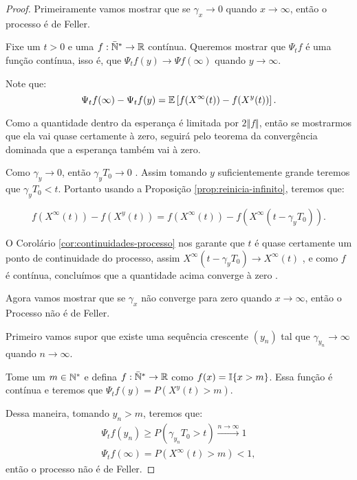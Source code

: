 \begin{proof}

  Primeiramente vamos mostrar que se $\gamma_x \to 0$ quando $x \to
  \infty$, então o processo é de Feller.

  Fixe um $t > 0$ e uma $f: {\mathbb{\bar{N}^*}} \to {\mathbb{R}}$ contínua. Queremos mostrar
  que $\Psi_t f$ é uma função contínua, isso é, que $\Psi_t f(y) \to
  \Psi f (\infty)$ quando $y \to \infty$.

  Note que:
  \begin{displaymath}
    \Psi_t f(\infty) - \Psi_t f (y) =
    {\mathbb{E}} \left[
      f(X^\infty(t)) - f(X^y(t))
    \right].
  \end{displaymath}

  Como a quantidade dentro da esperança é limitada por $2 \Vert f
  \Vert$, então se mostrarmos que ela vai quase certamente à zero,
  seguirá pelo teorema da convergência dominada que a esperança também
  vai à zero.

  Como $\gamma_y \to 0$, então $\gamma_y T_0 \to 0$ \qc. Assim tomando
  $y$ suficientemente grande teremos que $\gamma_y T_0 < t$. Portanto
  usando a Proposição \ref{prop:reinicia-infinito}, teremos que:

  \begin{displaymath}
    f(X^\infty(t)) - f(X^y(t)) = 
    f(X^\infty(t)) - f(X^\infty(t-\gamma_y T_0)).
  \end{displaymath}

  O Corolário \ref{cor:continuidades-processo} nos garante que $t$ é
  quase certamente um ponto de continuidade do processo, assim
  $X^\infty(t-\gamma_y T_0) \to X^\infty(t)$ \qc, e como $f$ é
  contínua, concluímos que a quantidade acima converge à zero \qc.


  Agora vamos mostrar que se $\gamma_x$ não converge para zero quando
  $x \to \infty$, então o Processo não é de Feller.

  Primeiro vamos supor que existe uma sequência crescente $(y_n)$ tal
  que $\gamma_{y_n} \to \infty$ quando $n \to \infty$.

  Tome um $m \in {\mathbb{N^*}}$ e defina $f: {\mathbb{\bar{N}^*}} \to {\mathbb{R}}$ como $f(x) = {\mathbb{I}} \{ x
  > m \}$. Essa função é contínua e teremos que $\Psi_t f (y) =
  P\left( X^y(t) > m \right)$.

  Dessa maneira, tomando $y_n > m$, teremos que:
  \begin{gather*}
    \Psi_t f(y_n) \geq P(\gamma_{y_n} T_0 > t) \xrightarrow{n \to
      \infty} 1\\
    \Psi_t f(\infty) = P(X^{\infty}(t) > m) < 1, 
  \end{gather*}
  então o processo não é de Feller.
  


\end{proof}
